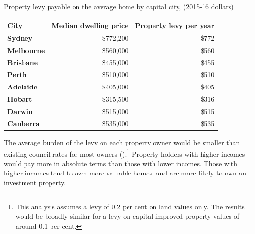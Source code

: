 \begin{table}
%
{Property levy payable on the average home by capital city, (2015-16 dollars)}
\begin{tabularx}{\columnwidth}{lRR}
\toprule
\textbf{City} & {\textbf{Median dwelling price}} & \textbf{Property levy per year} \\
\midrule
\textbf{Sydney} & {\$772,200} & \$772 \\
\textbf{Melbourne} & {\$560,000} & \$560 \\
\textbf{Brisbane} & {\$455,000} & \$455 \\
\textbf{Perth} & {\$510,000} & \$510 \\
\textbf{Adelaide} & {\$405,000} & \$405 \\
\textbf{Hobart} & {\$315,500} & \$316 \\
\textbf{Darwin} & {\$515,000} & \$515 \\
\textbf{Canberra} & {\$535,000} & \$535 \\
\bottomrule
\end{tabularx}

\end{table}

The average burden of the levy on each property owner would be
smaller than existing council rates for most owners ().\footnote{This analysis assumes a levy of 0.2 per cent on land values only. The results
would be broadly similar for a levy on capital improved property values of around
0.1 per cent.}
Property holders with higher incomes would pay more in absolute
terms than those with lower incomes. Those with higher incomes
tend to own more valuable homes, and are more likely to own an
investment property.

